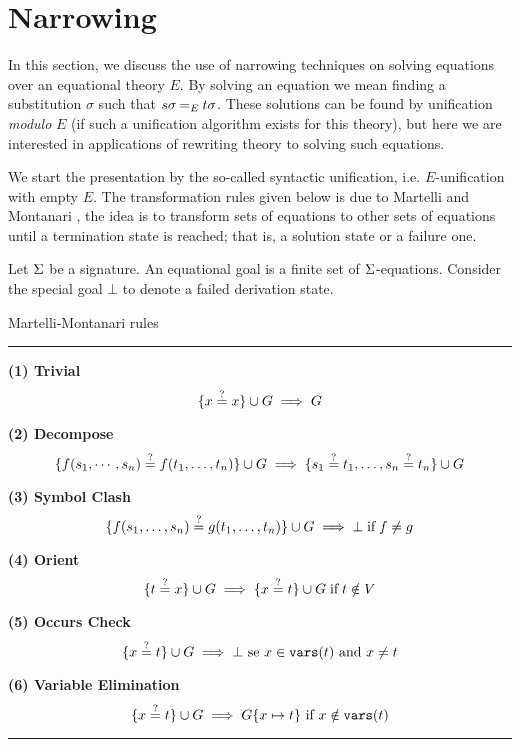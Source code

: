 \section{Narrowing}

In this section, we discuss the use of narrowing techniques on solving equations over an equational theory $E$. By solving an equation we mean finding a substitution $\sigma$ such that $s \sigma \mathbin{=_{E}} t\sigma$. These solutions can be found by unification \textit{modulo} $E$ (if such a unification algorithm exists for this theory), but here we are interested in applications of rewriting theory to solving such equations.

We start the presentation by the so-called syntactic unification, i.e. $E$-unification with empty $E$. The transformation rules given below is due to Martelli and Montanari \cite{DBLP:books/el/RV01/BaaderS01}, the idea is to transform sets of equations to other sets of equations until a termination state is reached; that is, a solution state or a failure one.

\begin{definition}
	Let $\Sigma$ be a signature. An equational goal is a finite set of $\Sigma$-equations. Consider the special goal $\bot$ to denote a failed derivation state.
\end{definition}

\begin{table}[ht]
	\caption{Martelli-Montanari rules}
	\label{table:unify_inf_rules}
	{\small
		\hrule
		\vspace{10pt}

		\textbf{(1) Trivial}
        $$\{ x\overset{?}{=}x \} \cup G \implies G $$

		\textbf{(2) Decompose}
		$$\{f(s_1, \cdots, s_n)\overset{?}{=}f(t_1, \dots, t_n)\} \cup G \implies \{s_1\overset{?}{=}t_1, \dots , s_n\overset{?}{=}t_n \} \cup G$$

		\textbf{(3) Symbol Clash}
		$$\{ f(s_1, \dots, s_n)\overset{?}{=}g(t_1, \dots, t_n) \} \cup G \implies \bot \; \text{if} \; f \neq g $$

		\textbf{(4) Orient}
		$$\{ t\overset{?}{=}x \} \cup G \implies \{ x\overset{?}{=}t \} \cup G \; \text{if} \; t \notin V$$

		\textbf{(5) Occurs Check}
		$$\{ x\overset{?}{=}t \} \cup G \implies \bot \text{ se } x \in \mathtt{vars}(t) \text{ and } x \neq t$$

		\textbf{(6) Variable Elimination}
		$$\{ x\overset{?}{=}t \} \cup G \implies G\{x \mapsto t\} \text{ if } x \notin \mathtt{vars}(t)$$
		\hrule
	}
\end{table}

